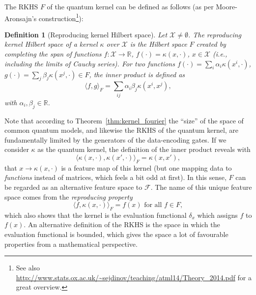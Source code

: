 \documentclass[aps, reprint, onecolumn, nofootinbib, longbibliography]{revtex4-2}
\newtheorem{definition}{Definition}[]
\begin{document}
The RKHS $F$ of the quantum kernel can be defined as follows (as per Moore-
Aronsajn's construction\footnote{See also \url{http://www.stats.ox.ac.uk/~sejdinov/teaching/atml14/Theory_2014.pdf} for a great overview.}):
\begin{definition}[Reproducing kernel Hilbert space]\label{def:rkhs}
Let $\mathcal{X} \neq \emptyset$. The reproducing kernel Hilbert space of a kernel $\kappa$ over $\mathcal{X}$ is the Hilbert space $F$ created by completing the span of functions $f: \mathcal{X} \rightarrow \mathbb{R}$, $f(\cdot) = \kappa(x, \cdot)$, $x \in \mathcal{X}$ (i.e., including the limits of Cauchy series). For two functions $f(\cdot) = \sum_i \alpha_i \kappa(x^i, \cdot)$, $g(\cdot)=\sum_j \beta_j \kappa(x^j, \cdot) \in F$, the inner product is defined as
\begin{equation}\langle f, g\rangle_{F} =  \sum_{ij} \alpha_i \beta_j \kappa(x^i, x^j),  \end{equation}
with $ \alpha_i, \beta_j \in \mathbb{R}$.
\end{definition}
Note that according to Theorem~\ref{thm:kernel_fourier} the ``size'' of the space of common quantum models, and likewise the RKHS of the quantum kernel, are fundamentally limited by the generators of the data-encoding gates. If we consider $\kappa$ as the quantum kernel, the definition of the inner product reveals with
\begin{equation}
    \langle \kappa(x, \cdot), \kappa(x', \cdot) \rangle_{F} =  \kappa(x, x'),
\end{equation}
that $x \rightarrow \kappa(x, \cdot)$ is a feature map of this kernel (but one mapping data to \textit{functions} instead of matrices, which feels a bit odd at first). In this sense, $F$ can be regarded as an alternative feature space to $\mathcal{F}$. The name of this unique feature space comes from the \textit{reproducing property} 
\begin{equation}
    \langle f, \kappa(x, \cdot) \rangle_{F} = f(x) \text{ for all } f \in F,
\end{equation}
which also shows that the kernel is the evaluation functional $\delta_x$ which assigns $f$ to $f(x)$. An alternative definition of the RKHS is the space in which the evaluation functional is bounded, which gives the space a lot of favourable properties from a mathematical perspective.
\end{document}
